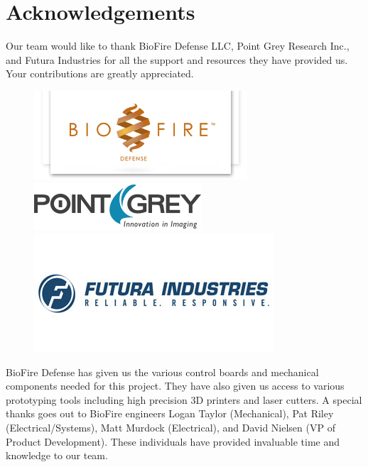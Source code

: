 \documentclass[11pt,english]{article}
\begin{document}
\section{Acknowledgements}
Our team would like to thank BioFire Defense LLC, Point Grey Research Inc., and Futura Industries for all the support and resources they have provided us. Your contributions are greatly appreciated.


\begin{figure}[!htb]
  \includegraphics[width=\linewidth]{biofire_logo.png}
  \label{fig:biofire_logo}
\endminipage\hfill
{}
  \includegraphics[width=\linewidth]{point_grey.png}
  \label{fig:point_grey}
\endminipage\hfill
{}%
  \includegraphics[width=\linewidth]{futura_indust.jpg}
  \label{fig:futura_indst}
\endminipage
\label{fig:project_sponsors}
\end{figure}

BioFire Defense has given us the various control boards and mechanical components needed for this project. They have also given us access to various prototyping tools including high precision 3D printers and laser cutters. A special thanks goes out to BioFire engineers Logan Taylor (Mechanical), Pat Riley (Electrical/Systems), Matt Murdock (Electrical), and David Nielsen (VP of Product Development). These individuals have provided invaluable time and knowledge to our team.
\end{document}
